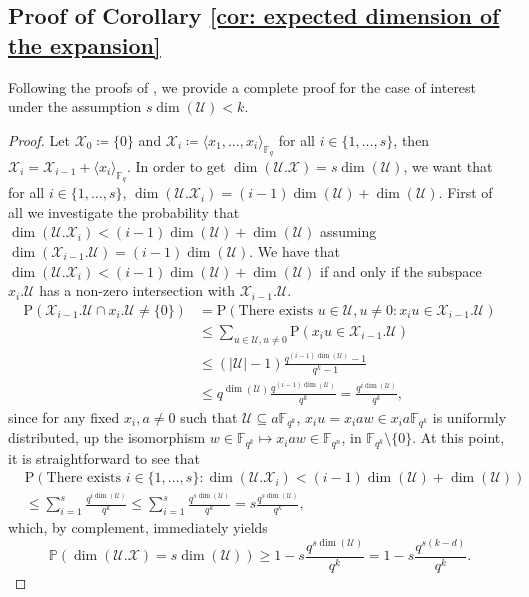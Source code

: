 \documentclass{article}
\newcommand{\Fq}{\mathbb{F}_{q}}
\newcommand{\Fqn}{\mathbb{F}_{q^n}}
\newcommand{\Fqk}{\mathbb{F}_{q^k}}
\newcommand{\calU}{\mathcal{U}}
\newcommand{\calX}{\mathcal{X}}
\newcommand{\Span}[2]{\langle #2 \rangle_{#1}}
\begin{document}
\subsection{Proof of Corollary \ref{cor: expected dimension of the expansion}}
\label{sec: proof of corollary 1}
Following the proofs of \cite[Lemma III.2 and Proposition III.3]{Aragon19}, we provide a complete proof for the case of interest under the assumption $s \dim(\calU)<k$.
\begin{proof}
    Let $\calX_0\coloneqq\{0\}$ and $\calX_i\coloneqq\Span{\Fq}{x_1,\ldots,x_i}$ for all $i\in\{1,\ldots,s\}$, then $\calX_i=\calX_{i-1}+\Span{\Fq}{x_i}$. In order to get $\dim(\calU.\calX)=s \dim(\calU)$, we want that for all $i\in\{1,\ldots,s\}$, $\dim(\calU.\calX_i)=(i-1)\dim(\calU)+\dim(\calU)$. First of all we investigate the probability that $\dim(\calU.\calX_i)<(i-1)\dim(\calU)+\dim(\calU)$ assuming $\dim(\calX_{i-1}.\calU)=(i-1)\dim(\calU)$. We have that $\dim(\calU.\calX_i)<(i-1)\dim(\calU)+\dim(\calU)$ if and only if the subspace $x_i.\calU$ has a non-zero intersection with $\calX_{i-1}.\calU$.
    \begin{align*}
        \mathrm{P}(\calX_{i-1}.\calU\cap x_i.\calU\neq \{0\})&=\mathrm{P}(\text{There exists }u\in\calU, u\neq 0\colon x_iu\in\calX_{i-1}.\calU)\\
        &\leq \sum_{u\in\calU, u\neq 0}\mathrm{P}(x_iu\in\calX_{i-1}.\calU)\\
        &\leq (\lvert\calU\rvert-1)\frac{q^{(i-1)\dim(\calU)}-1}{q^k-1}\\
        &\leq q^{\dim(\calU)}\frac{q^{(i-1)\dim(\calU)}}{q^k}=\frac{q^{i\dim(\calU)}}{q^k},
    \end{align*}
    since for any fixed $x_i,a\neq 0$ such that $\calU\subseteq a\Fqk$, $x_iu=x_iaw\in x_ia\Fqk$ is uniformly distributed, up the isomorphism $w\in\Fqk\mapsto x_iaw\in\Fqn$, in $\Fqk\setminus\{0\}$. At this point, it is straightforward to see that
    \begin{align*}
        &\mathrm{P}(\text{There exists }i\in\{1,\ldots,s\}\colon\dim(\calU.\calX_i)<(i-1)\dim(\calU)+\dim(\calU))\\
        &\leq \sum_{i=1}^s\frac{q^{i\dim(\calU)}}{q^k}\leq \sum_{i=1}^s\frac{q^{s\dim(\calU)}}{q^k}=s\frac{q^{s\dim(\calU)}}{q^k},
    \end{align*}
    which, by complement, immediately yields
    \[
     \mathbb{P}(\dim(\calU.\calX)=s\dim(\calU))\geq 1-s\frac{q^{s\dim(\calU)}}{q^k}=1-s\frac{q^{s(k-d)}}{q^k}.
    \]
\end{proof}
\end{document}
